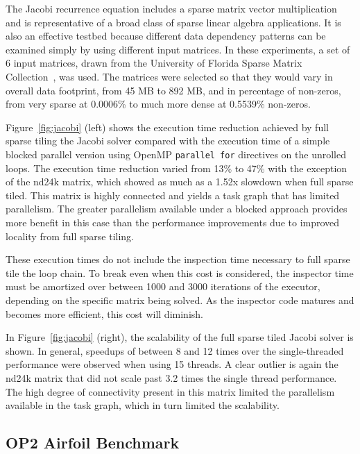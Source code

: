 The Jacobi recurrence equation includes a sparse matrix vector multiplication and is representative of a broad class of sparse linear algebra applications. It is also an effective testbed because different data dependency patterns can be examined simply by using different input matrices. In these experiments, a set of 6 input matrices, drawn from the University of Florida Sparse Matrix Collection~\citep{ST-MatrixMarket}, was used. The matrices were selected so that they would vary in overall data footprint, from 45 MB to 892 MB, and in percentage of non-zeros, from very sparse at 0.0006\% to 
much more dense at 0.5539\% non-zeros. %

Figure~\ref{fig:jacobi} (left) shows the execution time reduction achieved by full sparse tiling the Jacobi solver  compared with the execution time of a simple blocked parallel version using OpenMP \texttt{parallel for} directives on the unrolled loops. The execution time reduction varied from 13\% to 47\% with the exception of the nd24k matrix, which showed as much as a 1.52x slowdown when full sparse tiled. This matrix is highly connected and yields a task graph that has limited parallelism. The greater parallelism available under a blocked approach provides more benefit in this case than the performance improvements due to improved locality from full sparse tiling.

These execution times do not include the inspection time necessary to full sparse tile the loop chain. To break even when this cost is considered, the inspector time must be amortized over between 1000 and 3000 iterations of the executor, depending on the specific matrix being solved. As the inspector code matures and becomes more efficient, this cost will diminish.

In Figure~\ref{fig:jacobi} (right),  the scalability of the full sparse tiled Jacobi solver is shown. In general, speedups of between 8 and 12 times over the single-threaded performance were observed when using 15 threads. A clear outlier is again the nd24k matrix that did not scale past 3.2 times the single thread performance. The high degree of connectivity present in this matrix limited the parallelism available in the task graph, which in turn limited the scalability.

\subsection{OP2 Airfoil Benchmark}

